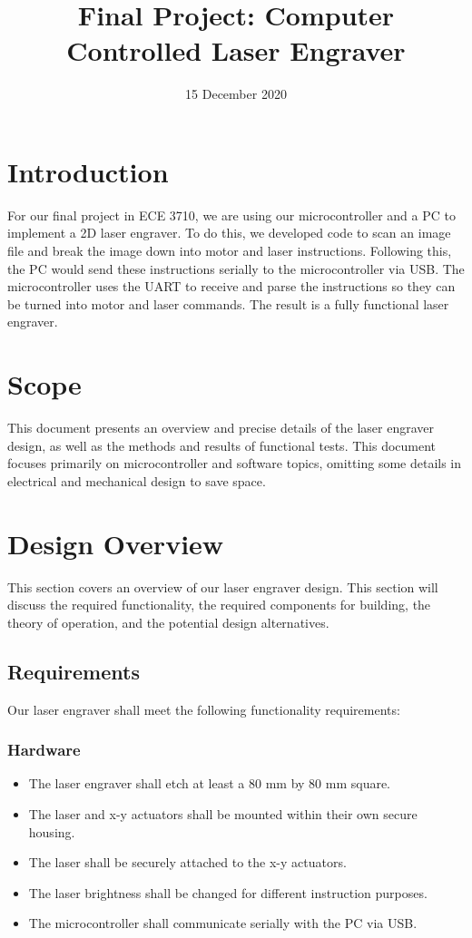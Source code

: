 \documentclass[11pt]{LaTeX-Classes/math-hw}
\title{Final Project: Computer Controlled Laser Engraver}
\date{15 December 2020}
\begin{document}
\maketitle

\section{Introduction}
For our final project in ECE 3710, we are using our microcontroller and a PC to implement a 2D laser engraver. To do this, we developed code to scan an image file and break the image down into motor and laser instructions. Following this, the PC would send these instructions serially to the microcontroller via USB. The microcontroller uses the UART to receive and parse the instructions so they can be turned into motor and laser commands. The result is a fully functional laser engraver.

\section{Scope}
This document presents an overview and precise details of the laser engraver design,
as well as the methods and results of functional tests.
This document focuses primarily on microcontroller and software topics,
omitting some details in electrical and mechanical design to save space.

\section{Design Overview}
This section covers an overview of our laser engraver design. This section will discuss the required functionality, the required components for building, the theory of operation, and the potential design alternatives. 
\subsection{Requirements}
Our laser engraver shall meet the following functionality requirements:
\subsubsection*{Hardware}
	\begin{itemize}
		\item The laser engraver shall etch at least a 80 mm by 80 mm square.
		\item The laser and x-y actuators shall be mounted within their own secure housing.
		\item The laser shall be securely attached to the x-y actuators.
		\item The laser brightness shall be changed for different instruction purposes.
		\item The microcontroller shall communicate serially with the PC via USB.
	\end{itemize}
\end{document}
